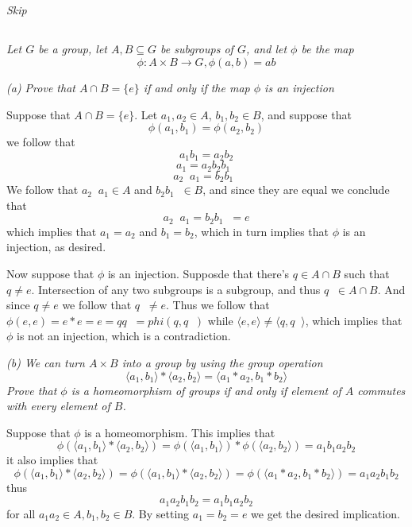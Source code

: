 \documentclass[11pt,oneside,titlepage]{book}
\DeclareMathOperator \inv {^{-1}}
\newcommand{\eangle}[1]{\langle #1 \rangle}
\newcommand{\set}[1]{\{ #1 \}}
\begin{document}
\subsection{}

\textit{Skip}

\subsection{}

\textit{Let $G$ be a group, let $A, B \subseteq G$ be subgroups of
$G$, and let $\phi$ be the map
  $$\phi: A \times B \to G, \phi(a, b) = ab$$}

\textit{(a) Prove that $A \cap B = \set{e}$ if and only if the map
$\phi$ is an injection}

Suppose that $A \cap B = \set{e}$. Let $a_1, a_2 \in A$, $b_1, b_2 \in
B$, and suppose that
$$\phi(a_1, b_1) = \phi(a_2, b_2)$$
we follow that
$$a_1 b_1 = a_2 b_2$$
$$a_1  = a_2 b_2 b_1\inv$$
$$a_2 \inv a_1  = b_2 b_1\inv$$
We follow that $a_2 \inv a_1 \in A$ and $b_2 b_1 \inv \in B$, and
since they are equal we conclude that
$$a_2 \inv a_1 = b_2 b_1\inv  = e$$
which implies that $a_1 = a_2$ and $b_1 = b_2$, which in turn implies
that $\phi$ is an injection, as desired.

Now suppose that $\phi$ is an injection. Supposde that there's $q \in
A \cap B$ such that $q \neq e$. Intersection of any two subgroups is a
subgroup, and thus $q\inv \in A \cap B$. And since $q \neq e$ we
follow that $q\inv \neq e$. Thus we follow that $\phi(e, e) = e * e =
e = q q\inv = phi(q, q\inv)$ while $\eangle{e, e} \neq \eangle{q,
q\inv}$, which implies that $\phi$ is not an injection, which is a
contradiction.

\textit{(b) We can turn $A \times B$ into a group by using the group
operation
  $$\eangle{a_1, b_1} * \eangle{a_2, b_2}  = \eangle{a_1* a_2, b_1 * b_2}$$
  Prove that $\phi$ is a homeomorphism of groups if and only if
element of $A$ commutes with every element of $B$.}

Suppose that $\phi$ is a homeomorphism. This implies that
$$\phi(\eangle{a_1, b_1} * \eangle{a_2, b_2}) =
\phi(\eangle{a_1, b_1}) * \phi(\eangle{a_2, b_2}) = a_1 b_1 a_2 b_2 $$
it also implies that
$$\phi(\eangle{a_1, b_1} * \eangle{a_2, b_2}) =
\phi(\eangle{a_1, b_1} * \eangle{a_2, b_2}) = \phi(\eangle{a_1 * a_2 ,
b_1 * b_2}) = a_1 a_2 b_1 b_2 $$ thus
$$a_1 a_2 b_1 b_2 = a_1 b_1 a_2 b_2$$
for all $a_1 a_2 \in A, b_1, b_2 \in B$. By setting $a_1 = b_2 = e$ we
get the desired implication.
\end{document}
